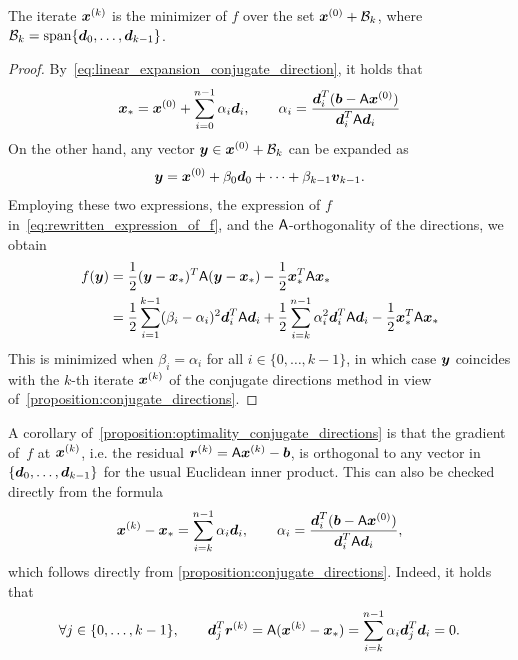 \begin{proposition}
    \label{proposition:optimality_conjugate_directions}
    The iterate $\mathbf{\boldsymbol{x}}^{(k)}$ is the minimizer of $f$ over the set $\mathbf{\boldsymbol{x}}^{(0)} + \mathcal B_k$,
    where $\mathcal B_k = \operatorname{span} \{\mathbf{\boldsymbol{d}}_0, \dotsc, \mathbf{\boldsymbol{d}}_{k-1} \}$.
\end{proposition}
\begin{proof}
    By~\eqref{eq:linear_expansion_conjugate_direction},
    it holds that
    \begin{equation*}
        \mathbf{\boldsymbol{x}}_* = \mathbf{\boldsymbol{x}}^{(0)} + \sum_{i=0}^{n-1} \alpha_i \mathbf{\boldsymbol{d}}_i,
        \qquad
        \alpha_i = \frac{\mathbf{\boldsymbol{d}}_i^T (\mathbf{\boldsymbol{b}} - \mathsf A \mathbf{\boldsymbol{x}}^{(0)})}{\mathbf{\boldsymbol{d}}_i^T \mathsf A \mathbf{\boldsymbol{d}}_i}
    \end{equation*}
    On the other hand,
    any vector $\mathbf{\boldsymbol{y}} \in \mathbf{\boldsymbol{x}}^{(0)} + \mathcal B_k$ can be expanded as
    \[
        \mathbf{\boldsymbol{y}} = \mathbf{\boldsymbol{x}}^{(0)} + \beta_0 \mathbf{\boldsymbol{d}}_0 + \dotsb + \beta_{k-1} \mathbf{\boldsymbol{v}}_{k-1}.
    \]
    Employing these two expressions, the expression of $f$ in~\eqref{eq:rewritten_expression_of_f},
    and the $\mathsf A$-orthogonality of the directions,
    we obtain
    \begin{align*}
        f(\mathbf{\boldsymbol{y}})
        &= \frac{1}{2} (\mathbf{\boldsymbol{y}} - \mathbf{\boldsymbol{x}}_*)^T \mathsf A (\mathbf{\boldsymbol{y}} - \mathbf{\boldsymbol{x}}_*) - \frac{1}{2} \mathbf{\boldsymbol{x}}_*^T \mathsf A \mathbf{\boldsymbol{x}}_* \\
        &= \frac{1}{2} \sum_{i=1}^{k-1} (\beta_i - \alpha_i)^2 \mathbf{\boldsymbol{d}}_i^T \mathsf A \mathbf{\boldsymbol{d}}_i
        + \frac{1}{2} \sum_{i=k}^{n-1} \alpha_i^2 \mathbf{\boldsymbol{d}}_i^T \mathsf A \mathbf{\boldsymbol{d}}_i - \frac{1}{2} \mathbf{\boldsymbol{x}}_*^T \mathsf A \mathbf{\boldsymbol{x}}_*
    \end{align*}
    This is minimized when $\beta_i = \alpha_i$ for all $i \in \{0, \dotsc, k-1\}$,
    in which case $\mathbf{\boldsymbol{y}}$ coincides with the $k$-th iterate $\mathbf{\boldsymbol{x}}^{(k)}$ of the conjugate directions method in view of~\cref{proposition:conjugate_directions}.
\end{proof}
A corollary of~\eqref{proposition:optimality_conjugate_directions} is that the gradient of~$f$ at $\mathbf{\boldsymbol{x}}^{(k)}$,
i.e. the residual $\mathbf{\boldsymbol{r}}^{(k)} = \mathsf A \mathbf{\boldsymbol{x}}^{(k)} - \mathbf{\boldsymbol{b}}$,
is orthogonal to any vector in $\{\mathbf{\boldsymbol{d}}_0, \dotsc, \mathbf{\boldsymbol{d}}_{k-1} \}$ for the usual Euclidean inner product.
This can also be checked directly from the formula
\[
    \mathbf{\boldsymbol{x}}^{(k)} - \mathbf{\boldsymbol{x}}_* = \sum_{i=k}^{n-1} \alpha_i \mathbf{\boldsymbol{d}}_i,
    \qquad \alpha_i = \frac{\mathbf{\boldsymbol{d}}_i^T (\mathbf{\boldsymbol{b}} - \mathsf A \mathbf{\boldsymbol{x}}^{(0)})}{\mathbf{\boldsymbol{d}}_i^T \mathsf A \mathbf{\boldsymbol{d}}_i},
\]
which follows directly from \cref{proposition:conjugate_directions}.
Indeed, it holds that
\begin{equation}
    \label{eq:orthogonality_residual}
    \forall j \in \{0, \dotsc, k-1\}, \qquad
    \mathbf{\boldsymbol{d}}_j^T \mathbf{\boldsymbol{r}}^{(k)} = \mathsf A (\mathbf{\boldsymbol{x}}^{(k)} - \mathbf{\boldsymbol{x}}_*)
    = \sum_{i=k}^{n-1} \alpha_i \mathbf{\boldsymbol{d}}_j^T \mathbf{\boldsymbol{d}}_i = 0.
\end{equation}

